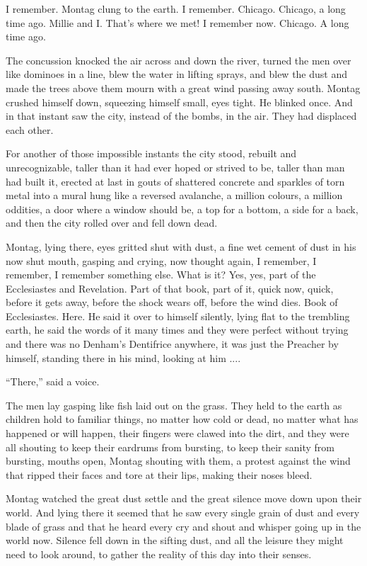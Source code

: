 \documentclass[11pt,openany]{book}
\begin{document}
I remember. Montag clung to the earth. I remember. Chicago. Chicago, a long time ago. Millie and I. That's where we met! I remember now. Chicago. A long time ago.

The concussion knocked the air across and down the river, turned the men over like dominoes in a line, blew the water in lifting sprays, and blew the dust and made the trees above them mourn with a great wind passing away south. Montag crushed himself down, squeezing himself small, eyes tight. He blinked once. And in that instant saw the city, instead of the bombs, in the air. They had displaced each other.

For another of those impossible instants the city stood, rebuilt and unrecognizable, taller than it had ever hoped or strived to be, taller than man had built it, erected at last in gouts of shattered concrete and sparkles of torn metal into a mural hung like a reversed avalanche, a million colours, a million oddities, a door where a window should be, a top for a bottom, a side for a back, and then the city rolled over and fell down dead.

Montag, lying there, eyes gritted shut with dust, a fine wet cement of dust in his now shut mouth, gasping and crying, now thought again, I remember, I remember, I remember something else. What is it? Yes, yes, part of the Ecclesiastes and Revelation. Part of that book, part of it, quick now, quick, before it gets away, before the shock wears off, before the wind dies. Book of Ecclesiastes. Here. He said it over to himself silently, lying flat to the trembling earth, he said the words of it many times and they were perfect without trying and there was no Denham's Dentifrice anywhere, it was just the Preacher by himself, standing there in his mind, looking at him ....

``There,'' said a voice.

The men lay gasping like fish laid out on the grass. They held to the earth as children hold to familiar things, no matter how cold or dead, no matter what has happened or will happen, their fingers were clawed into the dirt, and they were all shouting to keep their eardrums from bursting, to keep their sanity from bursting, mouths open, Montag shouting with them, a protest against the wind that ripped their faces and tore at their lips, making their noses bleed.

Montag watched the great dust settle and the great silence move down upon their world. And lying there it seemed that he saw every single grain of dust and every blade of grass and that he heard every cry and shout and whisper going up in the world now. Silence fell down in the sifting dust, and all the leisure they might need to look around, to gather the reality of this day into their senses.
\end{document}
